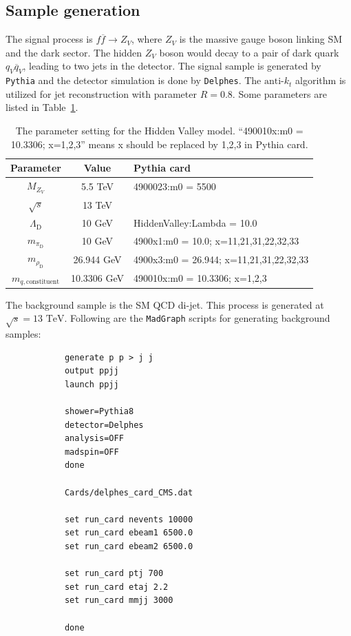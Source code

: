 \documentclass[12pt]{article}
\begin{document}
    \subsection{Sample generation}%
    \label{sub:sample_generation}
        The signal process is $f \overline{f} \to Z_V$, where $Z_V$ is the massive gauge boson linking SM and the dark sector. The hidden $Z_V$ boson would decay to a pair of dark quark $q_V \overline{q}_V$, leading to two jets in the detector. The signal sample is generated by \verb|Pythia| and the detector simulation is done by \verb|Delphes|. The $\text{anti-}k_t$ algorithm is utilized for jet reconstruction with parameter $R = 0.8$. Some parameters are listed in Table~\ref{tab:hv_model_signal_parameter}.

        \begin{table}[htpb]
            \centering
            \caption{The parameter setting for the Hidden Valley model. ``490010x:m0 = 10.3306; x=1,2,3'' means x should be replaced by 1,2,3 in Pythia card.}
            \label{tab:hv_model_signal_parameter}
            \begin{tabular}{c|c|l}
                Parameter                  & Value       & Pythia card                             \\ \hline
                $M_{Z_V}$                  & 5.5 TeV     & 4900023:m0 = 5500                       \\
                $\sqrt{s}$                 & 13 TeV      &                                         \\
                $\Lambda_{\text{D}}$       & 10 GeV      & HiddenValley:Lambda = 10.0              \\
                $m_{\pi_{\text{D}}}$       & 10 GeV      & 4900x1:m0 = 10.0; x=11,21,31,22,32,33   \\
                $m_{\rho_{\text{D}}}$      & 26.944 GeV  & 4900x3:m0 = 26.944; x=11,21,31,22,32,33 \\
                $m_{q,\text{constituent}}$ & 10.3306 GeV & 490010x:m0 = 10.3306; x=1,2,3          
            \end{tabular}
        \end{table}

        The background sample is the SM QCD di-jet. This process is generated at $\sqrt{s} = \text{13 TeV}$. Following are the \verb|MadGraph| scripts for generating background samples:   
        \begin{verbatim}
            generate p p > j j
            output ppjj
            launch ppjj

            shower=Pythia8
            detector=Delphes
            analysis=OFF
            madspin=OFF
            done

            Cards/delphes_card_CMS.dat

            set run_card nevents 10000
            set run_card ebeam1 6500.0
            set run_card ebeam2 6500.0

            set run_card ptj 700
            set run_card etaj 2.2
            set run_card mmjj 3000

            done    
        \end{verbatim}
\end{document}
